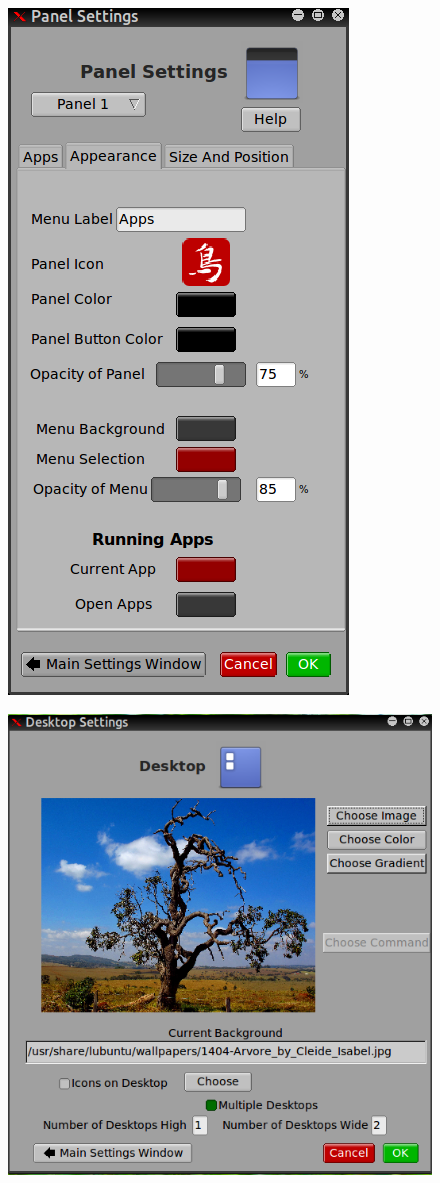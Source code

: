 \documentclass[12pt,a4paper]{book}
\begin{document}
\begin{figure}
\centering
\includegraphics[width=0.7\linewidth]{./panel-settings}
\caption{}
\label{fig:panel-settings}
\end{figure}





\begin{figure}
\centering
\includegraphics[width=0.7\linewidth]{./desktop-settings}
\caption{}
\label{fig:desktop-settings}
\end{figure}
\newpage
\end{document}
